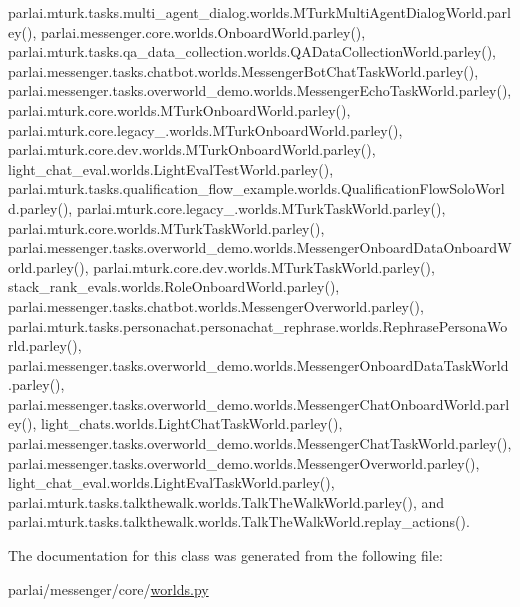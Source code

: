parlai.\+mturk.\+tasks.\+multi\+\_\+agent\+\_\+dialog.\+worlds.\+M\+Turk\+Multi\+Agent\+Dialog\+World.\+parley(), parlai.\+messenger.\+core.\+worlds.\+Onboard\+World.\+parley(), parlai.\+mturk.\+tasks.\+qa\+\_\+data\+\_\+collection.\+worlds.\+Q\+A\+Data\+Collection\+World.\+parley(), parlai.\+messenger.\+tasks.\+chatbot.\+worlds.\+Messenger\+Bot\+Chat\+Task\+World.\+parley(), parlai.\+messenger.\+tasks.\+overworld\+\_\+demo.\+worlds.\+Messenger\+Echo\+Task\+World.\+parley(), parlai.\+mturk.\+core.\+worlds.\+M\+Turk\+Onboard\+World.\+parley(), parlai.\+mturk.\+core.\+legacy\+\_.\+worlds.\+M\+Turk\+Onboard\+World.\+parley(), parlai.\+mturk.\+core.\+dev.\+worlds.\+M\+Turk\+Onboard\+World.\+parley(), light\+\_\+chat\+\_\+eval.\+worlds.\+Light\+Eval\+Test\+World.\+parley(), parlai.\+mturk.\+tasks.\+qualification\+\_\+flow\+\_\+example.\+worlds.\+Qualification\+Flow\+Solo\+World.\+parley(), parlai.\+mturk.\+core.\+legacy\+\_.\+worlds.\+M\+Turk\+Task\+World.\+parley(), parlai.\+mturk.\+core.\+worlds.\+M\+Turk\+Task\+World.\+parley(), parlai.\+messenger.\+tasks.\+overworld\+\_\+demo.\+worlds.\+Messenger\+Onboard\+Data\+Onboard\+World.\+parley(), parlai.\+mturk.\+core.\+dev.\+worlds.\+M\+Turk\+Task\+World.\+parley(), stack\+\_\+rank\+\_\+evals.\+worlds.\+Role\+Onboard\+World.\+parley(), parlai.\+messenger.\+tasks.\+chatbot.\+worlds.\+Messenger\+Overworld.\+parley(), parlai.\+mturk.\+tasks.\+personachat.\+personachat\+\_\+rephrase.\+worlds.\+Rephrase\+Persona\+World.\+parley(), parlai.\+messenger.\+tasks.\+overworld\+\_\+demo.\+worlds.\+Messenger\+Onboard\+Data\+Task\+World.\+parley(), parlai.\+messenger.\+tasks.\+overworld\+\_\+demo.\+worlds.\+Messenger\+Chat\+Onboard\+World.\+parley(), light\+\_\+chats.\+worlds.\+Light\+Chat\+Task\+World.\+parley(), parlai.\+messenger.\+tasks.\+overworld\+\_\+demo.\+worlds.\+Messenger\+Chat\+Task\+World.\+parley(), parlai.\+messenger.\+tasks.\+overworld\+\_\+demo.\+worlds.\+Messenger\+Overworld.\+parley(), light\+\_\+chat\+\_\+eval.\+worlds.\+Light\+Eval\+Task\+World.\+parley(), parlai.\+mturk.\+tasks.\+talkthewalk.\+worlds.\+Talk\+The\+Walk\+World.\+parley(), and parlai.\+mturk.\+tasks.\+talkthewalk.\+worlds.\+Talk\+The\+Walk\+World.\+replay\+\_\+actions().



The documentation for this class was generated from the following file\+:\begin{DoxyCompactItemize}
\item 
parlai/messenger/core/\hyperlink{parlai_2messenger_2core_2worlds_8py}{worlds.\+py}\end{DoxyCompactItemize}
